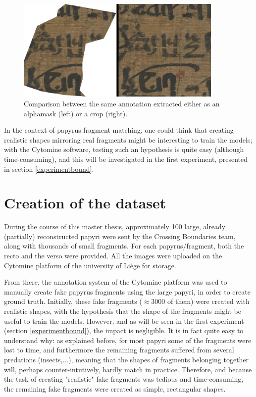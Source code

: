 \documentclass[11pt]{report}
\begin{document}
\begin{figure}[h!]
\centering\includegraphics[width=10cm]{compcrop.PNG}
\caption{Comparison between the same annotation extracted either as an alphamask (left) or a crop (right).}
\label{compcrop}
\end{figure}

In the context of papyrus fragment matching, one could think that creating realistic shapes mirroring real fragments might be interesting to train the models; with the Cytomine software, testing such an hypothesis is quite easy (although time-consuming), and this will be investigated in the first experiment, presented in section \ref{experimentbound}.


\section{Creation of the dataset}
\label{sec:data}

During the course of this master thesis, approximately 100 large, already (partially) reconstructed papyri were sent by the Crossing Boundaries team, along with thousands of small fragments. For each papyrus/fragment, both the recto and the verso were provided. All the images were uploaded on the Cytomine platform of the university of Liège for storage.\newline

From there, the annotation system of the Cytomine platform was used to manually create fake papyrus fragments using the large papyri, in order to create ground truth.\newline
Initially, these fake fragments ($\approx 3000$ of them) were created with realistic shapes, with the hypothesis that the shape of the fragments might be useful to train the models. However, and as will be seen in the first experiment (section \ref{experimentbound}), the impact is negligible. It is in fact quite easy to understand why: as explained before, for most papyri some of the fragments were lost to time, and furthermore the remaining fragments suffered from several predations (insects,...), meaning that the shapes of fragments belonging together will, perhaps counter-intutively, hardly match in practice.\newline
Therefore, and because the task of creating "realistic" fake fragments was tedious and time-consuming, the remaining fake fragments were created as simple, rectangular shapes.\newline
\end{document}
